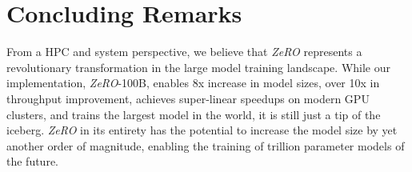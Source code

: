 \documentclass{article}
\newcommand{\name}{\emph{ZeRO}\xspace}
\begin{document}

\section{Concluding Remarks}
From a HPC and system perspective, we believe that \name represents a revolutionary transformation in the large model training landscape. While our implementation, \name-100B, enables 8x increase in model sizes, over 10x in throughput improvement, achieves super-linear speedups on modern GPU clusters, and trains the largest model in the world, it is still just a tip of the iceberg. \name in its entirety has the potential to increase the model size by yet another order of magnitude, enabling the training of trillion parameter models of the future. 
\end{document}
